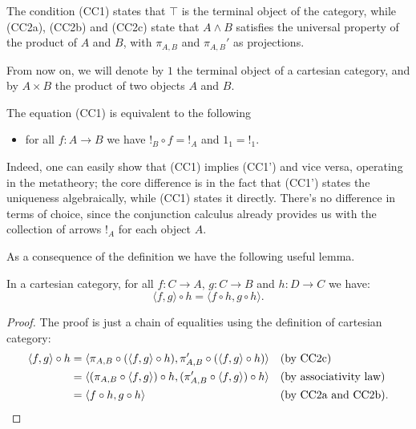 The condition (CC1) states that $\top$ is the terminal object of the category, while (CC2a), (CC2b) and (CC2c) state that $A \land B$ 
satisfies the universal property of the product of $A$ and $B$, with $\pi_{A,B}$ and $\pi_{A,B}'$ as projections.

\begin{notation}
    From now on, we will denote by $1$ the terminal object of a cartesian category, and by $A \times B$ the product of two objects $A$ and $B$.
\end{notation}

\begin{remark}
    The equation (CC1) is equivalent to the following
    \begin{itemize}
        \item[(\textnormal{CC1'})] for all $f : A \to B$ we have $!_B \circ f = !_A$ and $1_1 = !_1$.
    \end{itemize}
    Indeed, one can easily show that (CC1) implies (CC1') and vice versa, operating in the metatheory; the core difference is in the fact that (CC1') states the uniqueness algebraically, while (CC1) states it directly.
    There's no difference in terms of choice, since the conjunction calculus already provides us with the collection of arrows $!_A$ for each object $A$.
\end{remark}

As a consequence of the definition we have the following useful lemma.

\begin{lemma}
    In a cartesian category, for all $f : C \to A$, $g : C \to B$ and $h : D \to C$ we have:
    \[ \langle f,g\rangle \circ h = \langle f \circ h, g \circ h\rangle. \]
\end{lemma}

\begin{proof}
    The proof is just a chain of equalities using the definition of cartesian category:
    \begin{align*}
        \langle f,g\rangle \circ h &= \langle \pi_{A,B} \circ (\langle f,g\rangle \circ h), \pi_{A,B}' \circ (\langle f,g\rangle \circ h)\rangle &&(\textnormal{by CC2c}) \\
                                   &= \langle (\pi_{A,B} \circ \langle f,g\rangle) \circ h, (\pi_{A,B}' \circ \langle f,g\rangle) \circ h\rangle &&(\textnormal{by associativity law}) \\
                                   &= \langle f \circ h, g \circ h\rangle &&(\textnormal{by CC2a and CC2b}).
    \end{align*}
\end{proof}

